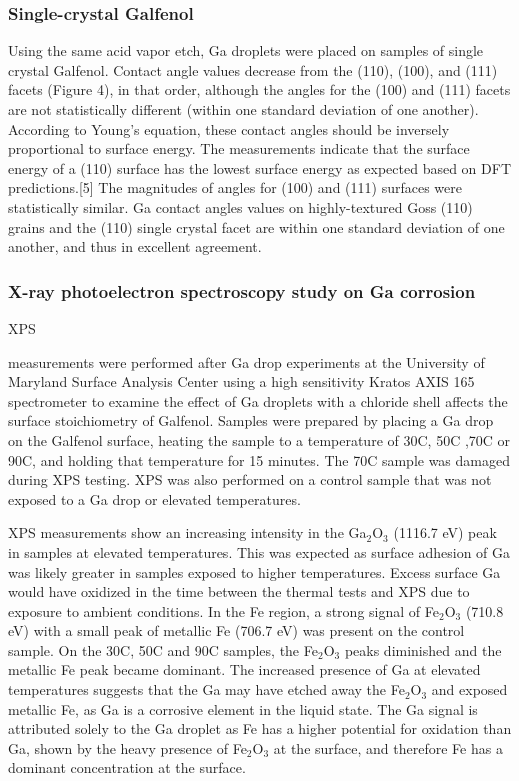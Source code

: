 \subsubsection{Single-crystal Galfenol}
Using the same acid vapor etch, Ga droplets were placed on samples of single crystal Galfenol. Contact angle values decrease from the (110), (100), and (111) facets (Figure 4), in that order, although the angles for the (100) and (111) facets are not statistically different (within one standard deviation of one another). According to Young’s equation, these contact angles should be inversely proportional to surface energy. The measurements indicate that the surface energy of a (110) surface has the lowest surface energy as expected based on DFT predictions.[5] The magnitudes of angles for (100) and (111) surfaces were statistically similar. Ga contact angles values on highly-textured Goss (110) grains and the (110) single crystal facet are within one standard deviation of one another, and thus in excellent agreement. 

\subsubsection{X-ray photoelectron spectroscopy study on Ga corrosion}

\hypertarget{xps-gallium}{XPS} measurements were performed after Ga drop experiments at the University of Maryland Surface Analysis Center using a high sensitivity Kratos AXIS 165 spectrometer to examine the effect of Ga droplets with a chloride shell affects the surface stoichiometry of Galfenol. Samples were prepared by placing a Ga drop on the Galfenol surface, heating the sample to a temperature of 30\degree C, 50\degree C ,70\degree C or 90\degree C, and holding that temperature for 15 minutes. The 70\degree C sample was damaged during XPS testing. XPS was also performed on a control sample that was not exposed to a Ga drop or elevated temperatures. 


XPS measurements show an increasing intensity in the Ga$_2$O$_3$ (1116.7 eV) peak in samples at elevated temperatures. This was expected as surface adhesion of Ga was likely greater in samples exposed to higher temperatures. Excess surface Ga would have oxidized in the time between the thermal tests and XPS due to exposure to ambient conditions. In the Fe region, a strong signal of Fe$_2$O$_3$ (710.8 eV) with a small peak of metallic Fe (706.7 eV) was present on the control sample. On the 30\degree C, 50\degree C and 90\degree C samples, the Fe$_2$O$_3$ peaks diminished and the metallic Fe peak became dominant. The increased presence of Ga at elevated temperatures suggests that the Ga may have etched away the Fe$_2$O$_3$ and exposed metallic Fe, as Ga is a corrosive element in the liquid state. The Ga signal is attributed solely to the Ga droplet as Fe has a higher potential for oxidation than Ga, shown by the heavy presence of Fe$_2$O$_3$ at the surface, and therefore Fe has a dominant concentration at the surface. 

	
	